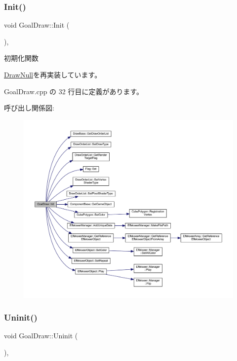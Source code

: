 \subsubsection{\texorpdfstring{Init()}{Init()}}
{\footnotesize\ttfamily void Goal\+Draw\+::\+Init (\begin{DoxyParamCaption}{ }\end{DoxyParamCaption})\hspace{0.3cm}{\ttfamily [override]}, {\ttfamily [virtual]}}



初期化関数 



\mbox{\hyperlink{class_draw_null_acd7fef3ccea1da537ac9507ffbb6dd2e}{Draw\+Null}}を再実装しています。



 Goal\+Draw.\+cpp の 32 行目に定義があります。

呼び出し関係図\+:\nopagebreak
\begin{figure}[H]
\begin{center}
\leavevmode
\includegraphics[width=350pt]{class_goal_draw_a3eb0a555fa2db9d2c1253018ea65796e_cgraph}
\end{center}
\end{figure}
\mbox{\label{class_goal_draw_a01318a0606848a3ca8ca7b7acbf4df24}} 
\subsubsection{\texorpdfstring{Uninit()}{Uninit()}}
{\footnotesize\ttfamily void Goal\+Draw\+::\+Uninit (\begin{DoxyParamCaption}{ }\end{DoxyParamCaption})\hspace{0.3cm}{\ttfamily [override]}, {\ttfamily [virtual]}}




